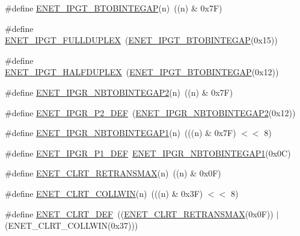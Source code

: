 \begin{DoxyCompactItemize}
\item 
\#define \hyperlink{group__ENET__17XX__40XX_ga7cdae0530c55e9f236d7d9d5bde3391a}{E\-N\-E\-T\-\_\-\-I\-P\-G\-T\-\_\-\-B\-T\-O\-B\-I\-N\-T\-E\-G\-A\-P}(n)~((n) \& 0x7\-F)
\item 
\#define \hyperlink{group__ENET__17XX__40XX_gabcaea91a823fd58281d82d9dcb754c2f}{E\-N\-E\-T\-\_\-\-I\-P\-G\-T\-\_\-\-F\-U\-L\-L\-D\-U\-P\-L\-E\-X}~(\hyperlink{group__ENET__17XX__40XX_ga7cdae0530c55e9f236d7d9d5bde3391a}{E\-N\-E\-T\-\_\-\-I\-P\-G\-T\-\_\-\-B\-T\-O\-B\-I\-N\-T\-E\-G\-A\-P}(0x15))
\item 
\#define \hyperlink{group__ENET__17XX__40XX_ga4c98e396a39809243d38a68b27eeec02}{E\-N\-E\-T\-\_\-\-I\-P\-G\-T\-\_\-\-H\-A\-L\-F\-D\-U\-P\-L\-E\-X}~(\hyperlink{group__ENET__17XX__40XX_ga7cdae0530c55e9f236d7d9d5bde3391a}{E\-N\-E\-T\-\_\-\-I\-P\-G\-T\-\_\-\-B\-T\-O\-B\-I\-N\-T\-E\-G\-A\-P}(0x12))
\item 
\#define \hyperlink{group__ENET__17XX__40XX_gab665d33e25749c26b32f51b2a9e14b79}{E\-N\-E\-T\-\_\-\-I\-P\-G\-R\-\_\-\-N\-B\-T\-O\-B\-I\-N\-T\-E\-G\-A\-P2}(n)~((n) \& 0x7\-F)
\item 
\#define \hyperlink{group__ENET__17XX__40XX_gacb2c77e9648c3945d156149617c6d620}{E\-N\-E\-T\-\_\-\-I\-P\-G\-R\-\_\-\-P2\-\_\-\-D\-E\-F}~(\hyperlink{group__ENET__17XX__40XX_gab665d33e25749c26b32f51b2a9e14b79}{E\-N\-E\-T\-\_\-\-I\-P\-G\-R\-\_\-\-N\-B\-T\-O\-B\-I\-N\-T\-E\-G\-A\-P2}(0x12))
\item 
\#define \hyperlink{group__ENET__17XX__40XX_ga346ffe9920e1abd20950e001e920d1fb}{E\-N\-E\-T\-\_\-\-I\-P\-G\-R\-\_\-\-N\-B\-T\-O\-B\-I\-N\-T\-E\-G\-A\-P1}(n)~(((n) \& 0x7\-F) $<$$<$ 8)
\item 
\#define \hyperlink{group__ENET__17XX__40XX_gabb7222a12e8e058581bca37fd98cbbe5}{E\-N\-E\-T\-\_\-\-I\-P\-G\-R\-\_\-\-P1\-\_\-\-D\-E\-F}~\hyperlink{group__ENET__17XX__40XX_ga346ffe9920e1abd20950e001e920d1fb}{E\-N\-E\-T\-\_\-\-I\-P\-G\-R\-\_\-\-N\-B\-T\-O\-B\-I\-N\-T\-E\-G\-A\-P1}(0x0\-C)
\item 
\#define \hyperlink{group__ENET__17XX__40XX_ga2e261dd603d1a1909d1b00e11634a958}{E\-N\-E\-T\-\_\-\-C\-L\-R\-T\-\_\-\-R\-E\-T\-R\-A\-N\-S\-M\-A\-X}(n)~((n) \& 0x0\-F)
\item 
\#define \hyperlink{group__ENET__17XX__40XX_ga541a85ac1f97834806ea7bd907ca7ef5}{E\-N\-E\-T\-\_\-\-C\-L\-R\-T\-\_\-\-C\-O\-L\-L\-W\-I\-N}(n)~(((n) \& 0x3\-F) $<$$<$ 8)
\item 
\#define \hyperlink{group__ENET__17XX__40XX_ga3840d22e13373045c63bc14bb36800a6}{E\-N\-E\-T\-\_\-\-C\-L\-R\-T\-\_\-\-D\-E\-F}~((\hyperlink{group__ENET__17XX__40XX_ga2e261dd603d1a1909d1b00e11634a958}{E\-N\-E\-T\-\_\-\-C\-L\-R\-T\-\_\-\-R\-E\-T\-R\-A\-N\-S\-M\-A\-X}(0x0\-F)) $\vert$ (\-E\-N\-E\-T\-\_\-\-C\-L\-R\-T\-\_\-\-C\-O\-L\-L\-W\-I\-N(0x37)))

\end{DoxyCompactItemize}
